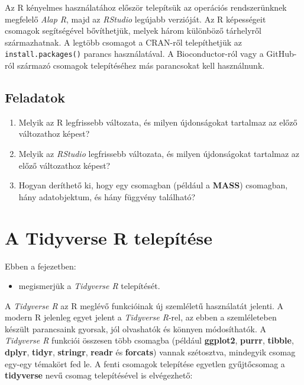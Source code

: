 \documentclass[
]{book}
\makeatletter
\providecommand{\tightlist}{%
  \setlength{\itemsep}{0pt}\setlength{\parskip}{0pt}}
\newenvironment{kframe}{%
\medskip{}
\setlength{\fboxsep}{.8em}
 \def\at@end@of@kframe{}%
 \ifinner\ifhmode%
  \def\at@end@of@kframe{\end{minipage}}%
  \begin{minipage}{\columnwidth}%
 \fi\fi%
 \def\FrameCommand##1{\hskip\@totalleftmargin \hskip-\fboxsep
 \colorbox{shadecolor}{##1}\hskip-\fboxsep
     \hskip-\linewidth \hskip-\@totalleftmargin \hskip\columnwidth}%
 \MakeFramed {\advance\hsize-\width
   \@totalleftmargin\z@ \linewidth\hsize
   \@setminipage}}%
 {\par\unskip\endMakeFramed%
 \at@end@of@kframe}
\newenvironment{rmdblock}[1]
  {
  \begin{itemize}
  \renewcommand{\labelitemi}{
    \raisebox{-.7\height}[0pt][0pt]{
      {\setkeys{Gin}{width=3em,keepaspectratio}\texttt{[image: images/\#1]}}
    }
  }
  \setlength{\fboxsep}{1em}
  \begin{kframe}
  \item
  }
  {
  \end{kframe}
  \end{itemize}
  }
\newenvironment{rmdlevel2}
  {\begin{rmdblock}{level2}}
  {\end{rmdblock}}
\newenvironment{rmdsummary}
  {\begin{rmdblock}{summary}}
  {\end{rmdblock}}
\newenvironment{rmdexercise}
  {\begin{rmdblock}{exercise}}
  {\end{rmdblock}}
\makeatother
\begin{document}
\begin{rmdsummary}
Az R kényelmes használatához először telepítsük az operációs
rendszerünknek megfelelő \emph{Alap R}, majd az \emph{RStudio} legújabb
verzióját. Az R képességeit csomagok segítségével bővíthetjük, melyek
három különböző tárhelyről származhatnak. A legtöbb csomagot a CRAN-ről
telepíthetjük az \texttt{install.packages()} parancs használatával. A
Bioconductor-ról vagy a GitHub-ról származó csomagok telepítéséhez más
parancsokat kell használnunk.
\end{rmdsummary}

\hypertarget{az-r-telepitese-1-exercise}{%
\subsection{Feladatok}\label{az-r-telepitese-1-exercise}}

\begin{rmdexercise}
\begin{enumerate}
\def\labelenumi{\arabic{enumi}.}
\tightlist
\item
  Melyik az R legfrissebb változata, és milyen újdonságokat tartalmaz az előző változathoz képest?
\item
  Melyik az \emph{RStudio} legfrissebb változata, és milyen újdonságokat tartalmaz az előző változathoz képest?
\item
  Hogyan deríthető ki, hogy egy csomagban (például a \textbf{MASS}) csomagban, hány adatobjektum, és hány függvény található?
\end{enumerate}
\end{rmdexercise}

\hypertarget{a-tidyverse-r-telepuxedtuxe9se}{%
\section{A Tidyverse R telepítése}\label{a-tidyverse-r-telepuxedtuxe9se}}

\begin{rmdlevel2}
Ebben a fejezetben:

\begin{itemize}
\tightlist
\item
  megismerjük a \emph{Tidyverse R} telepítését.
\end{itemize}
\end{rmdlevel2}

A \emph{Tidyverse R} az R meglévő funkcióinak új szemléletű használatát jelenti. A modern R jelenleg egyet jelent a \emph{Tidyverse R}-rel, az ebben a szemléleteben készült parancsaink gyorsak, jól olvashatók és könnyen módosíthatók. A \emph{Tidyverse R} funkciói összesen több csomagba (például \textbf{ggplot2}, \textbf{purrr}, \textbf{tibble}, \textbf{dplyr}, \textbf{tidyr}, \textbf{stringr}, \textbf{readr} és \textbf{forcats}) vannak szétosztva, mindegyik csomag egy-egy témakört fed le. A fenti csomagok telepítése egyetlen gyűjtőcsomag a \textbf{tidyverse} nevű csomag telepítésével is elvégezhető:
\end{document}
